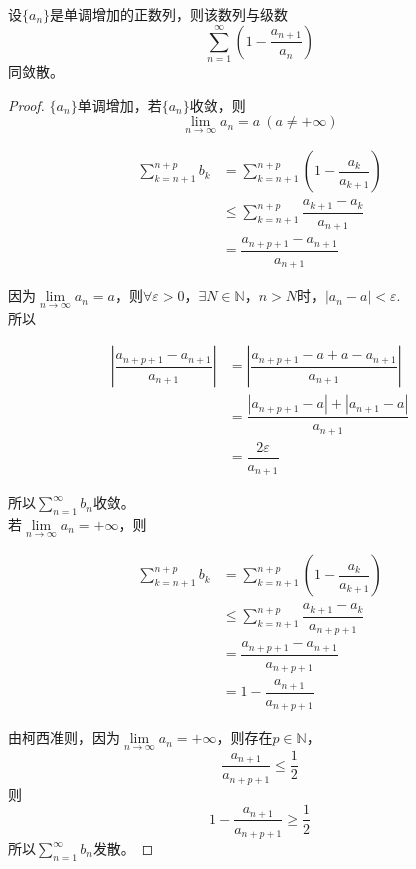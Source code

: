 \begin{theorem}

    设$\{a_n\}$是单调增加的正数列，则该数列与级数
    \[\sum\limits_{n = 1}^{\infty}{\left( 1 - \dfrac{a_{n + 1}}{a_n} \right)}\]
    同敛散。
        
\end{theorem}

\begin{proof}

    $\{a_n\}$单调增加，若$\{a_n\}$收敛，则
    \[\lim\limits_{n \to \infty}{a_n} = a \ (a \neq +\infty)\]

    \begin{align*}
        \sum\limits_{k = n + 1}^{n + p}{b_k} & = \sum\limits_{k = n + 1}^{n + p}{\left( 1 - \dfrac{a_k}{a_{k + 1}} \right)} \\
        & \leq \sum\limits_{k = n + 1}^{n + p}{\dfrac{a_{k + 1} - a_k}{a_{n + 1}}} \\
        & = \dfrac{a_{n + p + 1} - a_{n + 1}}{a_{n + 1}}
    \end{align*}

    因为$\lim\limits_{n \to \infty}{a_n} = a$，则$\forall \varepsilon > 0$，$\exists N \in \mathbb{N}$，$n > N$时，$|a_n - a| < \varepsilon$. \\
    所以

    \begin{align*}
        \left| \dfrac{a_{n + p + 1} - a_{n + 1}}{a_{n + 1}} \right| & = \left| \dfrac{a_{n + p + 1} - a + a - a_{n + 1}}{a_{n + 1}} \right| \\
        & = \dfrac{|a_{n + p + 1} - a| + |a_{n + 1} - a|}{a_{n + 1}} \\
        & = \dfrac{2\varepsilon}{a_{n + 1}}
    \end{align*} 

    所以$\sum\limits_{n = 1}^{\infty}{b_n}$收敛。\\
    若$\lim\limits_{n \to \infty}{a_n} = +\infty$，则

    \begin{align*}
        \sum\limits_{k = n + 1}^{n + p}{b_k} & = \sum\limits_{k = n + 1}^{n + p}{\left( 1 - \dfrac{a_k}{a_{k + 1}} \right)} \\
        & \leq \sum\limits_{k = n + 1}^{n + p}{\dfrac{a_{k + 1} - a_k}{a_{n + p + 1}}} \\
        & = \dfrac{a_{n + p + 1} - a_{n + 1}}{a_{n + p + 1}} \\
        & = 1 - \dfrac{a_{n + 1}}{a_{n + p + 1}}
    \end{align*}

    由柯西准则，因为$\lim\limits_{n \to \infty}{a_n} = +\infty$，则存在$p \in \mathbb{N}$，
    \[ \dfrac{a_{n + 1}}{a_{n + p + 1}} \leq \dfrac{1}{2}\]
    则
    \[ 1 - \dfrac{a_{n + 1}}{a_{n + p + 1}} \geq \dfrac{1}{2}\]
    所以$\sum\limits_{n = 1}^{\infty}{b_n}$发散。

\end{proof}

